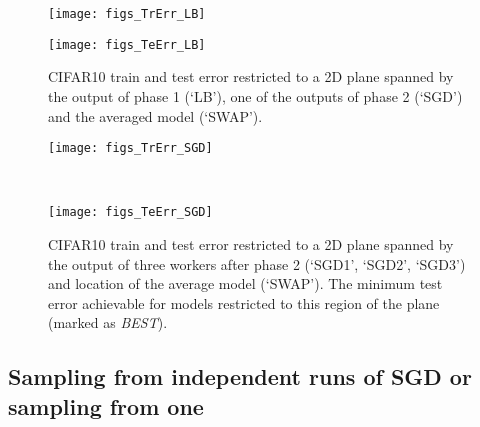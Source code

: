 \documentclass{article} %
\begin{document}
\begin{figure}[t] 
	\centering 
	\begin{minipage}{0.43\textwidth} 
		\centering
		\texttt{[image: figs\_TrErr\_LB]} 
		 \label{fig:vis_lb_TrErr} 
	\end{minipage}
	\begin{minipage}{0.43\textwidth} 
		\centering
		\texttt{[image: figs\_TeErr\_LB]} 
		\label{fig:vis_lb_TeErr} 
	\end{minipage} 
	\vspace{-0.1in}
\caption{\small
	CIFAR10 train and test error restricted to a 2D plane spanned by the output of phase 1 (`LB'), one of the outputs of phase 2 (`SGD') and the averaged model (`SWAP').} 
	\label{fig:vis_lb} 
	\vspace{-0.2in}
\end{figure}

\begin{figure}[t]
    \centering
    \begin{minipage}{0.43\textwidth}
        \centering
        \texttt{[image: figs\_TrErr\_SGD]}
        \label{fig:vis_sgd_TrErr}
    \end{minipage}%
    ~ ~
    \begin{minipage}{0.43\textwidth}
        \centering
        \texttt{[image: figs\_TeErr\_SGD]}
        \label{fig:vis_sgd_TeErr}
    \end{minipage}
\vspace{-0.1in}
    \caption{\small
    CIFAR10 train and test error restricted to a 2D plane spanned by the
    output of three workers after phase 2 (`SGD1', `SGD2', `SGD3') and location
    of the average model (`SWAP'). The minimum test error achievable for models restricted to this 
    region of the plane (marked as \textit{BEST}).}
    \label{fig:vis_sgd}
\end{figure}

\vspace{-0.1in}
\subsection{Sampling from independent runs of SGD or sampling from one}
\vspace{-0.05in}
\end{document}
